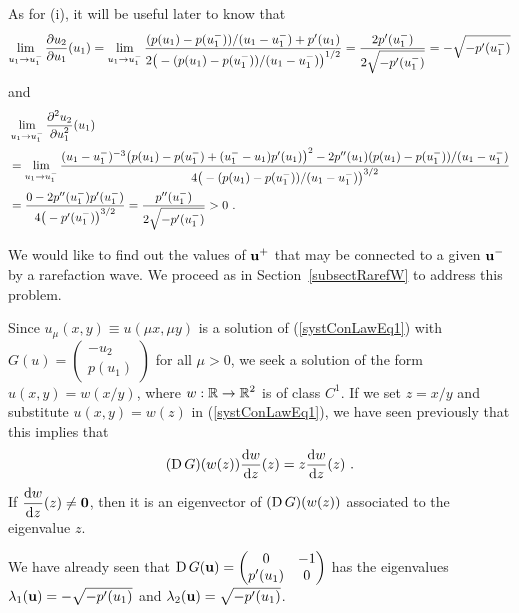 \begin{egg}
As for (i), it will be useful later to know that
\[
\lim_{u_1 \to u^-_1} \frac{\partial{u_2}}{\partial u_1}(u_1) =
\lim_{u_1 \to u^-_1} \frac{(p(u_1) - p(u^-_1))/(u_1-u^-_1) + p'(u_1)}
{2\big( -(p(u_1) - p(u^-_1))/(u_1-u^-_1) \big)^{1/2}} 
= \frac{2p'(u^-_1)}{2\sqrt{-p'(u^-_1)}} = -\sqrt{-p'(u^-_1)}
\]
and
\begin{align*}
&\lim_{u_1 \to u^-_1} \frac{\displaystyle \partial^{2}{u_2}} {\displaystyle \partial u_1^{2}}(u_1) \\
&=\lim_{u_1 \to u^-_1}
\frac{(u_1 -u^-_1)^{-3}\big(p(u_1) - p(u^-_1) +(u^-_1-u_1) p'(u_1)\big)^2
- 2 p''(u_1) (p(u_1)-p(u^-_1))/(u_1-u^-_1)}
{4\big(-(p(u_1) - p(u^-_1))/(u_1 - u^-_1)\big)^{3/2}} \\
&= \frac{0  - 2 p''(u^-_1) p'(u^-_1)}{4 \big(-p'(u^-_1)\big)^{3/2}}
= \frac{p''(u^-_1)}{2 \sqrt{-p'(u^-_1)}} > 0 \ .
\end{align*}

  We would like to find out the values
of $\displaystyle \mathbf{u}^+$ that may be connected to a given
$\displaystyle \mathbf{u}^-$ by a
rarefaction wave.  We proceed as in Section~\ref{subsectRarefW} to
address this problem.

Since $u_\mu(x,y) \equiv u(\mu x, \mu y)$ is a solution of
(\ref{systConLawEq1}) with
$\displaystyle G(u) = \begin{pmatrix} -u_2 \\ p(u_1) \end{pmatrix}$
for all $\mu >0$, we seek a solution of the form $u(x,y) = w(x/y)$, where
$\displaystyle w:\mathbb{R} \to \mathbb{R}^2$ is of class $\displaystyle C^1$.  If we
set $z = x/y$ and substitute $u(x,y) = w(z)$ in (\ref{systConLawEq1}),
we have seen previously that this implies that
\[
(\operatorname{D} G)(w(z)) \frac{\mathrm{d}w}{\mathrm{d}{z}}(z) = z \frac{\mathrm{d}w}{\mathrm{d}{z}}(z) \ .
\]
If $\displaystyle \frac{\mathrm{d}w}{\mathrm{d}{z}}(z) \neq \mathbf{0}$, then it is an
eigenvector of $(\operatorname{D} G)(w(z))$ associated to the eigenvalue $z$.

We have already seen that
$\displaystyle \operatorname{D} G(\mathbf{u}) = \begin{pmatrix} 0 & -1 \\
p'(u_1) & 0 \end{pmatrix}$ has the eigenvalues
$\lambda_1(\mathbf{u}) = -\sqrt{-p'(u_1)}$ and
$\lambda_2(\mathbf{u}) = \sqrt{-p'(u_1)}$.


\end{egg}
